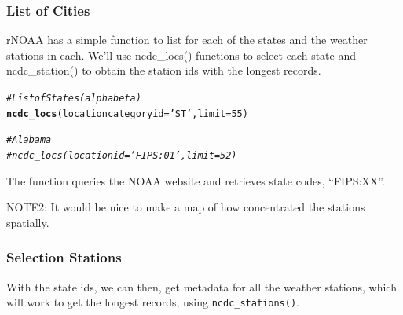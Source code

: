 \documentclass{article}\usepackage[]{graphicx}\usepackage[]{color}
\makeatletter
\newcommand{\hlnum}[1]{\textcolor[rgb]{0.686,0.059,0.569}{#1}}%
\newcommand{\hlstr}[1]{\textcolor[rgb]{0.192,0.494,0.8}{#1}}%
\newcommand{\hlcom}[1]{\textcolor[rgb]{0.678,0.584,0.686}{\textit{#1}}}%
\newcommand{\hlstd}[1]{\textcolor[rgb]{0.345,0.345,0.345}{#1}}%
\newcommand{\hlkwc}[1]{\textcolor[rgb]{0.333,0.667,0.333}{#1}}%
\newcommand{\hlkwd}[1]{\textcolor[rgb]{0.737,0.353,0.396}{\textbf{#1}}}%
\newenvironment{kframe}{%
 \def\at@end@of@kframe{}%
 \ifinner\ifhmode%
  \def\at@end@of@kframe{\end{minipage}}%
  \begin{minipage}{\columnwidth}%
 \fi\fi%
 \def\FrameCommand##1{\hskip\@totalleftmargin \hskip-\fboxsep
 \colorbox{shadecolor}{##1}\hskip-\fboxsep
     \hskip-\linewidth \hskip-\@totalleftmargin \hskip\columnwidth}%
 \MakeFramed {\advance\hsize-\width
   \@totalleftmargin\z@ \linewidth\hsize
   \@setminipage}}%
 {\par\unskip\endMakeFramed%
 \at@end@of@kframe}
\newenvironment{knitrout}{}{} %
\makeatother
\begin{document}
\subsubsection{List of Cities}

rNOAA has a simple function to list for each of the states and the weather stations in each. We'll use ncdc\_locs() functions to select each state and ncdc\_station() to obtain the station ids with the longest records. 

\begin{knitrout}
\color{fgcolor}\begin{kframe}
\begin{alltt}
\hlcom{# List of States (alpha beta)}
\hlkwd{ncdc_locs}\hlstd{(}\hlkwc{locationcategoryid}\hlstd{=}\hlstr{'ST'}\hlstd{,} \hlkwc{limit}\hlstd{=}\hlnum{55}\hlstd{)}

\hlcom{# Alabama }
\hlcom{# ncdc_locs(locationid='FIPS:01', limit=52)}
\end{alltt}
\end{kframe}
\end{knitrout}

The function queries the NOAA website and retrieves state codes, ``FIPS:XX''.  


NOTE2: It would be nice to make a map of how concentrated the stations spatially. 


\subsubsection{Selection Stations}

With the state ids, we can then, get metadata for all the weather stations, which will work to get the longest records, using \texttt{ncdc\_stations()}. 
\end{document}
